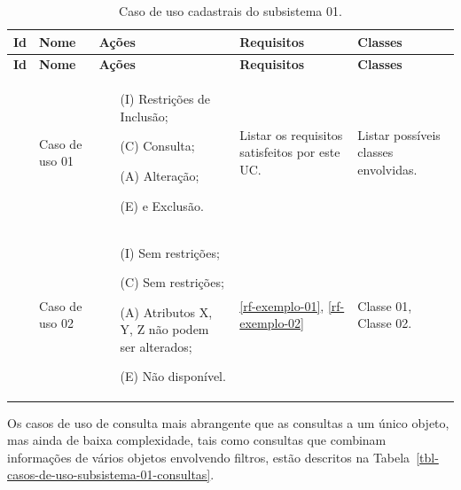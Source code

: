 \begin{longtable}{|c|p{2.5cm}|p{6cm}|p{2.2cm}|p{2cm}|}
	\caption{Caso de uso cadastrais do subsistema 01.}
	\label{tbl-casos-de-uso-subsistema-01-cruds} \\\hline 
	
	\rowcolor{lightgray}
	\textbf{Id} & \textbf{Nome} & \textbf{Ações} & \textbf{Requisitos} & \textbf{Classes} \\\hline	
	\endfirsthead
	\hline
	\rowcolor{lightgray}
	\textbf{Id} & \textbf{Nome} & \textbf{Ações} & \textbf{Requisitos} & \textbf{Classes} \\\hline	
	\endhead
	
	\UC\label{uc-subsistema-01-exemplo-01} & Caso de uso 01 & 
		\begin{itemize}[nosep,leftmargin=8mm]\vspace{-6mm}
			\item[(I)] Restrições de Inclusão;
			\item[(C)] Consulta;
			\item[(A)] Alteração;
			\item[(E)] e Exclusão.
		\vspace{-4mm}\end{itemize}
		& Listar os requisitos satisfeitos por este UC. 
		& Listar possíveis classes envolvidas.
		\\\hline

	\UC\label{uc-subsistema-01-exemplo-02} & Caso de uso 02 & 
		\begin{itemize}[nosep,leftmargin=8mm]\vspace{-6mm}
			\item[(I)] Sem restrições;
			\item[(C)] Sem restrições;
			\item[(A)] Atributos X, Y, Z não podem ser alterados;
			\item[(E)] Não disponível.
		\vspace{-4mm}\end{itemize}
		& \ref{rf-exemplo-01}, \ref{rf-exemplo-02}
		& Classe 01, Classe 02.
		\\\hline
\end{longtable}

Os casos de uso de consulta mais abrangente que as consultas a um único objeto, mas ainda de baixa complexidade, tais como consultas que combinam informações de vários objetos envolvendo filtros, estão descritos na Tabela~\ref{tbl-casos-de-uso-subsistema-01-consultas}.

